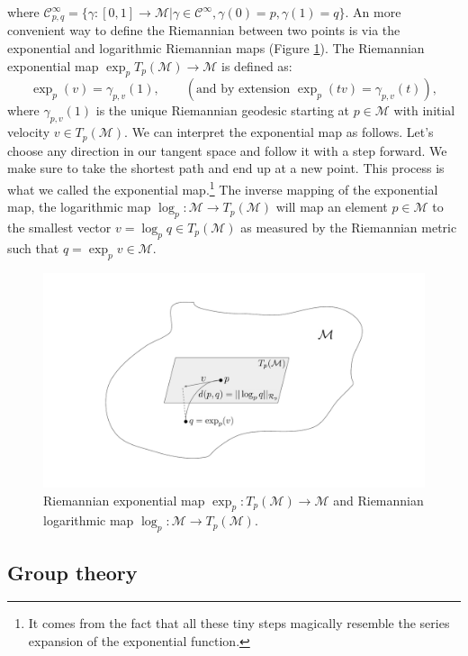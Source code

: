 \documentclass{article}
\begin{document}
where $\mathcal{C}^\infty_{p, q} = \{ \gamma : [0, 1] \to \mathcal{M} | \gamma \in \mathcal{C}^\infty, \gamma(0) = p,  \gamma(1) = q\}$. An more convenient way to define the Riemannian between two points is via the exponential and logarithmic Riemannian maps (Figure \ref{fig:explogmap}). The Riemannian exponential map $\exp_p T_p(\mathcal{M}) \to \mathcal{M}$ is defined as:
\begin{equation}
\exp_p (v) = \gamma_{p, v}(1) ,\qquad (\text{and by extension } \exp_p (tv) = \gamma_{p, v}(t)),
\end{equation}
where $\gamma_{p,v}(1)$ is the unique Riemannian geodesic starting at $p \in \mathcal{M}$ with initial velocity $v \in T_p(\mathcal{M})$. We can interpret the exponential map as follows. Let’s choose any direction in our tangent space and follow it with a step forward. We make sure to take the shortest path and end up at a new point. This process is what we called the exponential map.\footnote{It comes from the fact that all these tiny steps magically resemble the series expansion of the exponential function.} The inverse mapping of the exponential map, the logarithmic map $\log_p : \mathcal{M} \to T_p(\mathcal{M})$ will map an element $p \in \mathcal{M}$ to the smallest vector $v = \log_p q \in T_p(\mathcal{M})$ as measured by the Riemannian metric such that $q = \exp_p v \in \mathcal{M}$.

\begin{figure}[h!]
    \centering
    \includegraphics[width=\textwidth]{Images/distexplog.pdf}
    \caption{Riemannian exponential map $\exp_p : T_p(\mathcal{M}) \to \mathcal{M}$ and Riemannian logarithmic map $\log_p : \mathcal{M} \to T_p(\mathcal{M})$.}
    \label{fig:explogmap}
\end{figure}


\subsection{Group theory} \label{app:group_theory}
\end{document}

